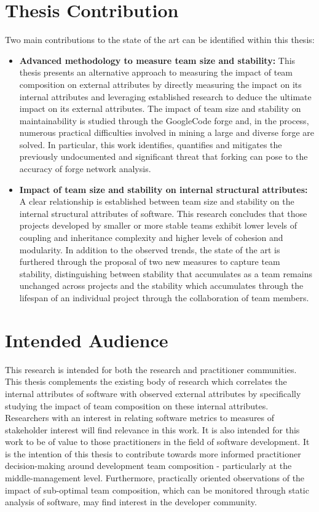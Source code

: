 \section{Thesis Contribution} %
Two main contributions to the state of the art can be identified within this thesis:

\begin{itemize}
\item \textbf{Advanced methodology to measure team size and stability:} This thesis presents an alternative approach to measuring the impact of team composition on external attributes by directly measuring the impact on its internal attributes and leveraging established research to deduce the ultimate impact on its external attributes. The impact of team size and stability on maintainability is studied through the GoogleCode forge and, in the process, numerous practical difficulties involved in mining a large and diverse forge are solved. In particular, this work identifies, quantifies and mitigates the previously undocumented and significant threat that forking can pose to the accuracy of forge network analysis.

\item \textbf{Impact of team size and stability on internal structural attributes:} A clear relationship is established between team size and stability on the internal structural attributes of software. This research concludes that those projects developed by smaller or more stable teams exhibit lower levels of coupling and inheritance complexity and higher levels of cohesion and modularity. In addition to the observed trends, the state of the art is furthered through the proposal of two new measures to capture team stability, distinguishing between stability that accumulates as a team remains unchanged across projects and the stability which accumulates through the lifespan of an individual project through the collaboration of team members.
\end{itemize}

\section{Intended Audience} %
This research is intended for both the research and practitioner communities. This thesis complements the existing body of research which correlates the internal attributes of software with observed external attributes by specifically studying the impact of team composition on these internal attributes. Researchers with an interest in relating software metrics to measures of stakeholder interest will find relevance in this work. It is also intended for this work to be of value to those practitioners in the field of software development. It is the intention of this thesis to contribute towards more informed practitioner decision-making around development team composition - particularly at the middle-management level. Furthermore, practically oriented observations of the impact of sub-optimal team composition, which can be monitored through static analysis of software, may find interest in the developer community.

